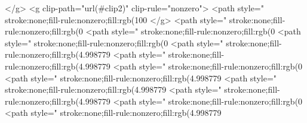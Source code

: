 </g>
<g clip-path="url(#clip2)" clip-rule="nonzero">
<path style=" stroke:none;fill-rule:nonzero;fill:rgb(100%
</g>
<path style=" stroke:none;fill-rule:nonzero;fill:rgb(0%
<path style=" stroke:none;fill-rule:nonzero;fill:rgb(0%
<path style=" stroke:none;fill-rule:nonzero;fill:rgb(0%
<path style=" stroke:none;fill-rule:nonzero;fill:rgb(4.998779%
<path style=" stroke:none;fill-rule:nonzero;fill:rgb(4.998779%
<path style=" stroke:none;fill-rule:nonzero;fill:rgb(0%
<path style=" stroke:none;fill-rule:nonzero;fill:rgb(4.998779%
<path style=" stroke:none;fill-rule:nonzero;fill:rgb(4.998779%
<path style=" stroke:none;fill-rule:nonzero;fill:rgb(4.998779%
<path style=" stroke:none;fill-rule:nonzero;fill:rgb(0%
<path style=" stroke:none;fill-rule:nonzero;fill:rgb(4.998779%
